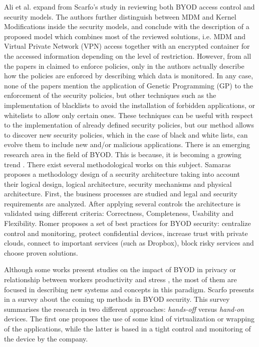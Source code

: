 Ali et al. expand from Scarfo's study in \cite{ali2015analysis} reviewing both BYOD access control  and security models. The authors further distinguish between MDM and Kernel Modifications inside the security models, and conclude with the description of a proposed model which combines most of the reviewed solutions, i.e. MDM and Virtual Private Network (VPN) access together with an encrypted container for the accessed information depending on the level of restriction. However, from all the papers in \cite{ali2015analysis} claimed to enforce policies, only in \cite{rhee2013high} the authors actually describe how the policies are enforced by describing which data is monitored. In any case, none of the papers mention the application of Genetic Programming (GP) to the enforcement of the security policies, but other techniques such as the implementation of blacklists to avoid the installation of forbidden applications, or whitelists to allow only certain ones. These techniques can be useful with respect to the implementation of already defined security policies, but our method allows to discover new security policies, which in the case of black and white lists, can evolve them to include new and/or malicious applications.
There is an emerging research area in the field of BYOD. This is because, it is becoming a growing trend \cite{Garba15organisational}. There exist several methodological works on this subject. Samaras \cite{Samaras13SaaS} proposes a methodology design of a security architecture taking into account their logical design, logical architecture, security mechanisms and physical architecture. First, the business processes are studied and legal and security requirements are analyzed. After applying several controls the architecture is validated using different criteria: Correctness, Completeness, Usability and Flexibility. Romer \cite{Romer14BestPractices} proposes a set of best practices for BYOD security: centralize control and monitoring, protect confidential devices, increase trust with private clouds, connect to important services (such as Dropbox), block risky services and choose proven solutions.

Although some works present studies on the impact of BYOD in privacy \cite{Miller12Privacy} or relationship between workers productivity and stress \cite{Haejung12Door}, the most of them are focused in describing new systems and concepts in this paradigm. Scarfo presents in \cite{Scarfo12survey} a survey about the coming up methods in BYOD security. This survey summarises the research in two different approaches: {\em hands-off} versus {\em hand-on} devices. The first one proposes the use of some kind of virtualization or wrapping of the applications, while the latter is based in a tight control and monitoring of the device by the company.

